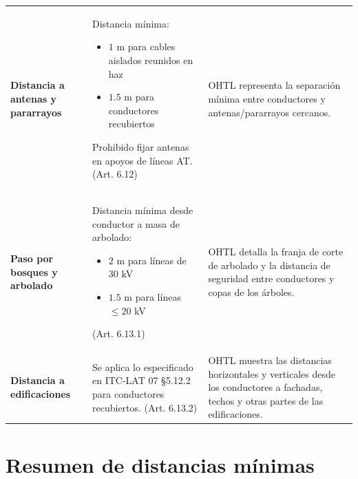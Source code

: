 \documentclass[12pt,a4paper]{article}
\begin{document}
\begin{longtable}{p{3.5cm}p{5cm}p{5cm}}
\addlinespace

\textbf{Distancia a antenas y}
\textbf{pararrayos}
&
Distancia mínima:
\begin{itemize}
    \item $1$ m para cables aislados reunidos en haz
    \item $1.5$ m para conductores recubiertos
\end{itemize}
Prohibido fijar antenas en apoyos de líneas AT.
(Art. 6.12)
&
OHTL representa la separación mínima entre
conductores y antenas/pararrayos cercanos.
\\

\addlinespace

\textbf{Paso por bosques y}
\textbf{arbolado}
&
Distancia mínima desde conductor a masa de arbolado:
\begin{itemize}
    \item $2$ m para líneas de $30$ kV
    \item $1.5$ m para líneas $\le 20$ kV
\end{itemize}
(Art. 6.13.1)
&
OHTL detalla la franja de corte de arbolado y la
distancia de seguridad entre conductores y copas
de los árboles.
\\

\addlinespace

\textbf{Distancia a edificaciones}
&
Se aplica lo especificado en ITC-LAT 07 \S 5.12.2
para conductores recubiertos.
(Art. 6.13.2)
&
OHTL muestra las distancias horizontales y verticales
desde los conductores a fachadas, techos y otras partes
de las edificaciones.
\\

\end{longtable}

\newpage

\section*{Resumen de distancias mínimas}
\end{document}
